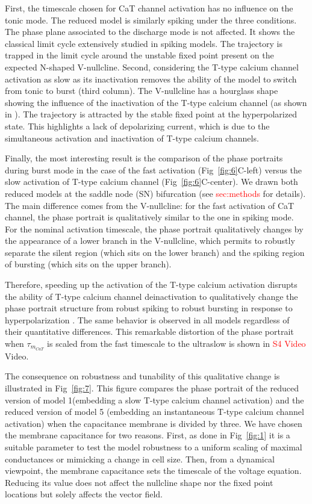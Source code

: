 First,  the timescale chosen for CaT channel activation has no influence on the tonic mode.  The reduced model is similarly spiking under the three conditions.  The phase plane associated to the discharge mode is not affected.  It shows the classical limit cycle extensively studied in spiking models.  The trajectory is trapped in the limit cycle around the unstable fixed point present on the expected N-shaped V-nullcline.  Second, considering the T-type calcium channel activation as slow as its inactivation removes the ability of the model to switch from tonic to burst (third column).  The V-nullcline has a hourglass shape showing the influence of the inactivation of the T-type calcium channel (as shown in \citep{drion_novel_2012}). The trajectory is attracted by the stable fixed point at the hyperpolarized state. This highlights a lack of depolarizing current, which is due to the simultaneous activation and inactivation of T-type calcium channels. 

Finally,  the most interesting result is the comparison of the phase portraits during burst mode in the case of the fast activation (Fig~\ref{fig:6}C-left) versus the slow activation of T-type calcium channel (Fig~\ref{fig:6}C-center).  We drawn both reduced models at the saddle node (SN) bifurcation (see \textcolor{red}{sec:methods} for details).  The main difference comes from the V-nullcline: for the fast activation of CaT channel, the phase portrait is qualitatively similar to the one in spiking mode. For the nominal activation timescale, the phase portrait qualitatively changes by the appearance of a lower branch in the V-nullcline, which permits to robustly separate the silent region (which sits on the lower branch) and the spiking region of bursting (which sits on the upper branch). 

Therefore, speeding up the activation of the T-type calcium activation disrupts the ability of T-type calcium channel deinactivation to qualitatively change the phase portrait structure from robust spiking to robust bursting in response to hyperpolarization \citep{drion_novel_2012,franci_balance_2013, franci_modeling_2014}. The same behavior is observed in all models regardless of their quantitative differences. This remarkable distortion of the phase portrait when $\tau_{m_{CaT}}$ is scaled from the fast timescale to the ultraslow is shown in \textcolor{red}{S4 Video} Video.

The consequence on robustness and tunability of this qualitative change is illustrated in Fig~\ref{fig:7}. This figure compares the phase portrait of the reduced version of model 1(embedding a slow T-type calcium channel activation) and the reduced version of model 5 (embedding an instantaneous T-type calcium channel activation) when the capacitance membrane is divided by three.  We have chosen the membrane capacitance for two reasons. First, as done in Fig~\ref{fig:1} it is a suitable parameter to test the model robustness to a uniform scaling of maximal conductances or mimicking a change in cell size. Then, from a dynamical viewpoint,  the membrane capacitance sets the timescale of the voltage equation. Reducing its value does not affect the nullcline shape nor the fixed point locations but solely affects the vector field.

